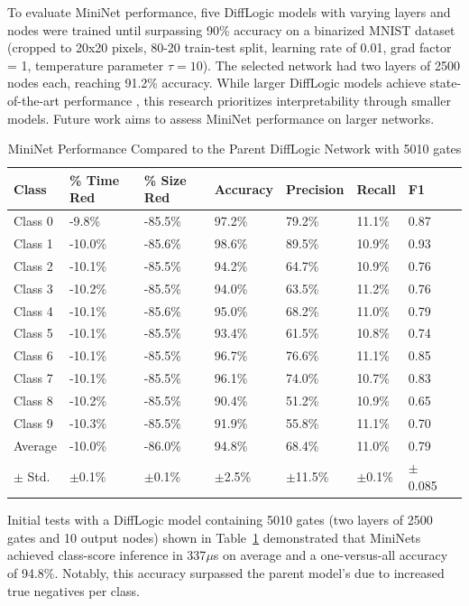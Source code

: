 To evaluate MiniNet performance, five DiffLogic models with varying layers and nodes were trained until surpassing 90\% accuracy on a binarized MNIST dataset (cropped to 20x20 pixels, 80-20 train-test split, learning rate of 0.01, grad factor = 1, temperature parameter $\tau=10$). The selected network had two layers of 2500 nodes each, reaching 91.2\% accuracy. While larger DiffLogic models achieve state-of-the-art performance \cite{difflogic}, this research prioritizes interpretability through smaller models. Future work aims to assess MiniNet performance on larger networks.

\begin{table}[htbp]
\caption{MiniNet Performance Compared to the Parent DiffLogic Network with 5010 gates}
\label{tab:mininets}
\begin{tabularx}{\textwidth}{lXXXXXXX}
\hline
Class & \% Time Red & \% Size Red & Accuracy & Precision & Recall & F1 \\
\hline
Class 0 & -9.8\% & -85.5\% & 97.2\% & 79.2\% & 11.1\% & 0.87 \\
Class 1 & -10.0\% & -85.6\% & 98.6\% & 89.5\% & 10.9\% & 0.93 \\
Class 2 & -10.1\% & -85.5\% & 94.2\% & 64.7\% & 10.9\% & 0.76 \\
Class 3 & -10.2\% & -85.5\% & 94.0\% & 63.5\% & 11.2\% & 0.76 \\
Class 4 & -10.1\% & -85.6\% & 95.0\% & 68.2\% & 11.0\% & 0.79 \\
Class 5 & -10.1\% & -85.5\% & 93.4\% & 61.5\% & 10.8\% & 0.74 \\
Class 6 & -10.1\% & -85.5\% & 96.7\% & 76.6\% & 11.1\% & 0.85 \\
Class 7 & -10.1\% & -85.5\% & 96.1\% & 74.0\% & 10.7\% & 0.83 \\
Class 8 & -10.2\% & -85.5\% & 90.4\% & 51.2\% & 10.9\% & 0.65 \\
Class 9 & -10.3\% & -85.5\% & 91.9\% & 55.8\% & 11.1\% & 0.70 \\
Average & -10.0\% & -86.0\% & 94.8\% & 68.4\% & 11.0\% & 0.79 \\
$\pm$ Std. & $\pm$0.1\% & $\pm$0.1\% & $\pm$2.5\% & $\pm$11.5\% & $\pm$0.1\% & $\pm$0.085 \\
\hline
\end{tabularx}
\end{table}


Initial tests with a DiffLogic model containing 5010 gates (two layers of 2500 gates and 10 output nodes) shown in Table~\ref{tab:mininets} demonstrated that MiniNets achieved class-score inference in 337$\mu$s on average and a one-versus-all accuracy of 94.8\%. Notably, this accuracy surpassed the parent model’s due to increased true negatives per class.

